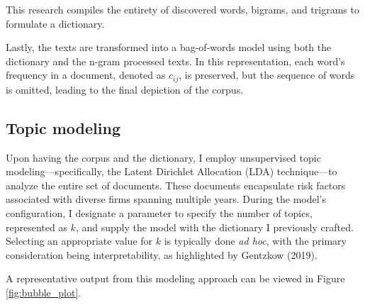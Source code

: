 \documentclass[12pt, letterpaper]{article}
\begin{document}
This research compiles the entirety of discovered words, bigrams, and trigrams to formulate a dictionary. 

Lastly, the texts are transformed into a bag-of-words model using both the dictionary and the n-gram processed texts. In this representation, each word's frequency in a document, denoted as \(c_{ij}\), is preserved, but the sequence of words is omitted, leading to the final depiction of the corpus.


%






\subsection{Topic modeling}

Upon having the corpus and the dictionary, I employ unsupervised topic modeling—specifically, the Latent Dirichlet Allocation (LDA) technique—to analyze the entire set of documents. These documents encapsulate risk factors associated with diverse firms spanning multiple years. During the model's configuration, I designate a parameter to specify the number of topics, represented as \(k\), and supply the model with the dictionary I previously crafted. Selecting an appropriate value for \(k\) is typically done \textit{ad hoc}, with the primary consideration being interpretability, as highlighted by Gentzkow (2019).

A representative output from this modeling approach can be viewed in Figure \ref{fig:bubble_plot}.
\end{document}

